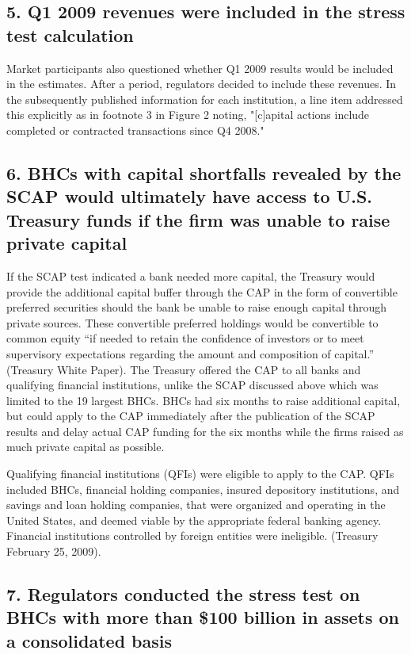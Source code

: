 \documentclass[justified, nobib]{tufte-handout2}
\begin{document}
\subsection{5. Q1 2009 revenues were included in the stress test
calculation}

Market participants also questioned whether Q1 2009 results would be
included in the estimates. After a period, regulators decided to include
these revenues. In the subsequently published information for each
institution, a line item addressed this explicitly as in footnote 3 in
Figure 2 noting, "{[}c{]}apital actions include completed or contracted
transactions since Q4
2008."

\subsection{6. BHCs with capital shortfalls revealed by the SCAP would
ultimately have access to U.S. Treasury funds if the firm was unable to
raise private
capital}

If the SCAP test indicated a bank needed more capital, the Treasury
would provide the additional capital buffer through the CAP in the form
of convertible preferred securities should the bank be unable to raise
enough capital through private sources. These convertible preferred
holdings would be convertible to common equity ``if needed to retain the
confidence of investors or to meet supervisory expectations regarding
the amount and composition of capital.'' (Treasury White Paper). The
Treasury offered the CAP to all banks and qualifying financial
institutions, unlike the SCAP discussed above which was limited to the
19 largest BHCs. BHCs had six months to raise additional capital, but
could apply to the CAP immediately after the publication of the SCAP
results and delay actual CAP funding for the six months while the firms
raised as much private capital as possible.

Qualifying financial institutions (QFIs) were eligible to apply to the
CAP. QFIs included BHCs, financial holding companies, insured depository
institutions, and savings and loan holding companies, that were
organized and operating in the United States, and deemed viable by the
appropriate federal banking agency. Financial institutions controlled by
foreign entities were ineligible. (Treasury February 25, 2009).

\subsection{7. Regulators conducted the stress test on BHCs with more
than \$100 billion in assets on a consolidated
basis}
\end{document}
